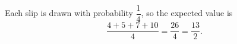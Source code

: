 Each slip is drawn with probability $\dfrac14$, so the expected value is
\[\dfrac{4+5+7+10}{4}=\dfrac{26}{4}=\boxed{\dfrac{13}{2}}.\]
